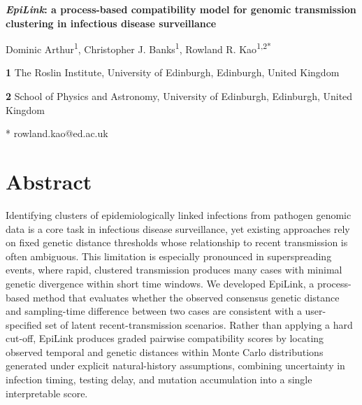 \documentclass[10pt,letterpaper]{article}
\begin{document}
\vspace*{0.2in}
\begin{flushleft}

    {\Large\bfseries\textit{EpiLink}: a process-based compatibility model for genomic transmission clustering in infectious disease surveillance}




    \bigskip

    Dominic Arthur\textsuperscript{1},
    Christopher J. Banks\textsuperscript{1},
    Rowland R. Kao\textsuperscript{1,2*}

    \bigskip

    \textbf{1} The Roslin Institute, University of Edinburgh, Edinburgh, United Kingdom

    \textbf{2} School of Physics and Astronomy, University of Edinburgh, Edinburgh, United Kingdom

    \bigskip

    * rowland.kao@ed.ac.uk
\end{flushleft}

\section*{Abstract}
Identifying clusters of epidemiologically linked infections from pathogen genomic data is a core task in infectious disease surveillance, yet existing approaches rely on fixed genetic distance thresholds whose relationship to recent transmission is often ambiguous. This limitation is especially pronounced in superspreading events, where rapid, clustered transmission produces many cases with minimal genetic divergence within short time windows. We developed EpiLink, a process-based method that evaluates whether the observed consensus genetic distance and sampling-time difference between two cases are consistent with a user-specified set of latent recent-transmission scenarios. Rather than applying a hard cut-off, EpiLink produces graded pairwise compatibility scores by locating observed temporal and genetic distances within Monte Carlo distributions generated under explicit natural-history assumptions, combining uncertainty in infection timing, testing delay, and mutation accumulation into a single interpretable score.
\end{document}
